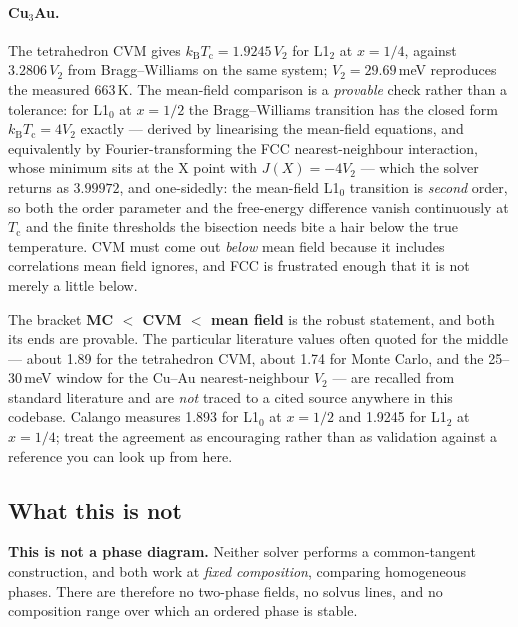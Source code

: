 \paragraph{Cu$_3$Au.} The tetrahedron CVM gives $k_\mathrm{B}T_\mathrm{c} =
1.9245\,V_2$ for L1$_2$ at $x = 1/4$, against $3.2806\,V_2$ from
Bragg--Williams on the same system; $V_2 = 29.69$\,meV reproduces the measured
663\,K. The mean-field comparison is a \emph{provable} check rather than a
tolerance: for L1$_0$ at $x = 1/2$ the Bragg--Williams transition has the closed
form $k_\mathrm{B}T_\mathrm{c} = 4V_2$ exactly --- derived by linearising the
mean-field equations, and equivalently by Fourier-transforming the FCC
nearest-neighbour interaction, whose minimum sits at the X point with
$J(X) = -4V_2$ --- which the solver returns as $3.99972$, and one-sidedly: the
mean-field L1$_0$ transition is \emph{second} order, so both the order parameter
and the free-energy difference vanish continuously at $T_\mathrm{c}$ and the
finite thresholds the bisection needs bite a hair below the true temperature.
CVM must come out \emph{below} mean field because it includes correlations mean
field ignores, and FCC is frustrated enough that it is not merely a little
below.

\begin{calnote}
The bracket \textbf{MC $<$ CVM $<$ mean field} is the robust statement, and both
its ends are provable. The particular literature values often quoted for the
middle --- about 1.89 for the tetrahedron CVM, about 1.74 for Monte Carlo, and
the 25--30\,meV window for the Cu--Au nearest-neighbour $V_2$ --- are recalled
from standard literature and are \emph{not} traced to a cited source anywhere in
this codebase. Calango measures 1.893 for L1$_0$ at $x = 1/2$ and 1.9245 for
L1$_2$ at $x = 1/4$; treat the agreement as encouraging rather than as
validation against a reference you can look up from here.
\end{calnote}

\subsection{What this is not}
\label{sec:cvm-limits}

\begin{calwarn}
\textbf{This is not a phase diagram.} Neither solver performs a common-tangent
construction, and both work at \emph{fixed composition}, comparing homogeneous
phases. There are therefore no two-phase fields, no solvus lines, and no
composition range over which an ordered phase is stable.
\end{calwarn}

